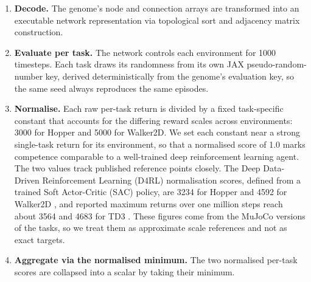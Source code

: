 \documentclass[12pt]{article}
\newcommand{\revBrit}[2]{#2}
\begin{document}
\begin{enumerate}
    \item \textbf{Decode.} The genome's node and connection arrays are transformed into an executable network representation via topological sort and adjacency matrix construction.
    \item \textbf{Evaluate per task.} The network controls each environment for 1000 timesteps. Each task draws its randomness from its own JAX pseudo-random-number key, derived deterministically from the genome's evaluation key, so the same seed always reproduces the same episodes.
    \item \textbf{\revBrit{E-06}{Normalise.}} Each raw per-task return is divided by a fixed task-specific constant that accounts for the differing reward scales across environments: 3000 for Hopper and 5000 for Walker2D. We set each constant near a strong single-task return for its environment, so that a normalised score of 1.0 marks competence comparable to a well-trained deep reinforcement learning agent. The two values track published reference points closely. The Deep Data-Driven Reinforcement
Learning (D4RL) normalisation scores, defined from a trained Soft Actor-Critic (SAC) policy, are 3234 for Hopper and 4592 for Walker2D \parencite{fu_d4rl_2020,haarnoja_soft_2018}, and reported maximum returns over one million steps reach about 3564 and 4683 for TD3 \parencite{fujimoto_addressing_2018}. These figures come from the MuJoCo versions of the tasks, so we treat them as approximate scale references and not as exact targets.
    \item \textbf{Aggregate via the normalised minimum.} The two normalised per-task scores are collapsed into a scalar by taking their minimum.
\end{enumerate}
\end{document}
